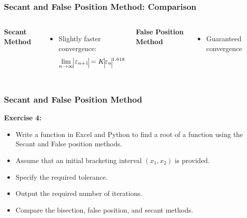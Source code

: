 \begin{frame}[fragile]
  \frametitle{Secant and False Position Method: Comparison}

  \begin{columns}
    \textbf{Secant Method}
    \vspace{0.1cm}
    \newline

    

    \begin{itemize}
      \item Slightly faster convergence:
            \[
              \lim_{n \to \infty} \vline\varepsilon_{n+1}\vline = K\vline\varepsilon_n\vline^{1.618}
            \]
    \end{itemize}

    \textbf{False Position Method}
    \vspace{0.3cm}
    \newline
    
    \begin{itemize}
      \item Guaranteed convergence
    \end{itemize}
  \end{columns}
\end{frame}

\begin{frame}[fragile]
  \frametitle{Secant and False Position Method}

  \textbf{Exercise 4:}
  \begin{itemize}
    \item Write a function in Excel and Python to find a root of a function using the Secant and False position methods.
    \item Assume that an initial bracketing interval \((x_1, x_2)\) is provided.
    \item Specify the required tolerance.
    \item Output the required number of iterations.
    \item Compare the bisection, false position, and secant methods.
  \end{itemize}
\end{frame}

